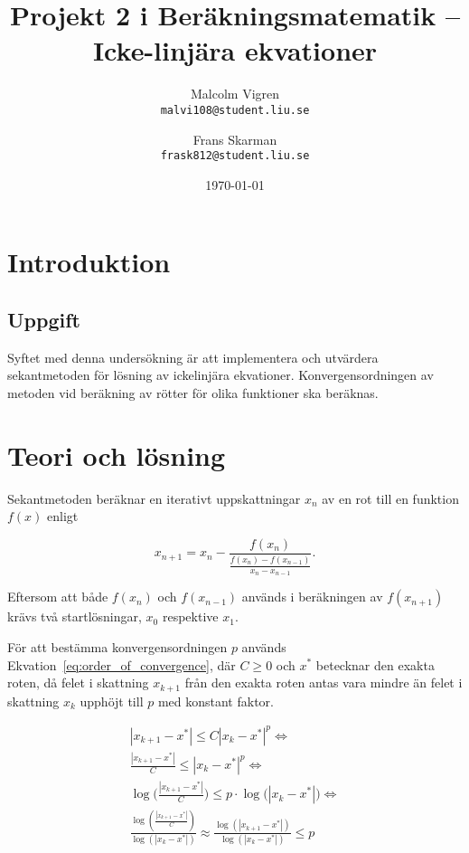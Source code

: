 \documentclass[a4paper,titlepage]{article}
\title{%
    \textbf{Projekt 2 i Beräkningsmatematik -- Icke-linjära ekvationer }}
\date{\today}
\author{%
    Malcolm Vigren \\
    \texttt{malvi108@student.liu.se}
    \and
    Frans Skarman\\
    \texttt{frask812@student.liu.se}
    }
\begin{document}
\maketitle
\newpage
\tableofcontents
\newpage

\section{Introduktion}

\subsection{Uppgift}

Syftet med denna undersökning är att implementera och utvärdera sekantmetoden
för lösning av ickelinjära ekvationer. Konvergensordningen av metoden vid
beräkning av rötter för olika funktioner ska beräknas.

\section{Teori och lösning}

Sekantmetoden beräknar en iterativt uppskattningar $x_n$ av en rot till en
funktion $f(x)$ enligt

\begin{equation}
    \label{eq:seq}
    x_{n+1} = x_{n} -
    \frac{f(x_n)}
        {\frac{f(x_n) - f(x_{n-1})}
                {x_n - x_{n-1}}
        }.
\end{equation}

Eftersom att både $f(x_n)$ och $f(x_{n-1})$ används i beräkningen av $f(x_{n+1})$ krävs
två startlösningar, $x_0$ respektive $x_1$.

För att bestämma konvergensordningen $p$ används Ekvation~\ref{eq:order_of_convergence}, där
$C \geq 0$ och $x^*$ betecknar den exakta roten, då felet i skattning $x_{k+1}$ 
från den exakta roten antas vara mindre än felet i skattning $x_{k}$ upphöjt till
$p$ med konstant faktor.

\begin{equation}
    \begin{gathered}
        |x_{k+1} - x^*| \leq C |x_k - x^*|^p \Leftrightarrow \\
        \frac{|x_{k+1} - x^*|}{C} \leq |x_{k} - x^*|^p \Leftrightarrow \\
        \log\big(\frac{|x_{k+1} - x^*|}{C} \big) \leq
            p \cdot \log\big(|x_{k} - x^*|\big) \Leftrightarrow \\
        \frac{\log(\frac{|x_{k+1} - x^*|}{C})}
            {\log(|x_{k} - x^*|)}
        \approx \frac{\log(|x_{k+1} - x^*|)}
            {\log(|x_{k} - x^*|)} \leq p \\
    \end{gathered}
    \label{eq:order_of_convergence}
\end{equation}
\end{document}
